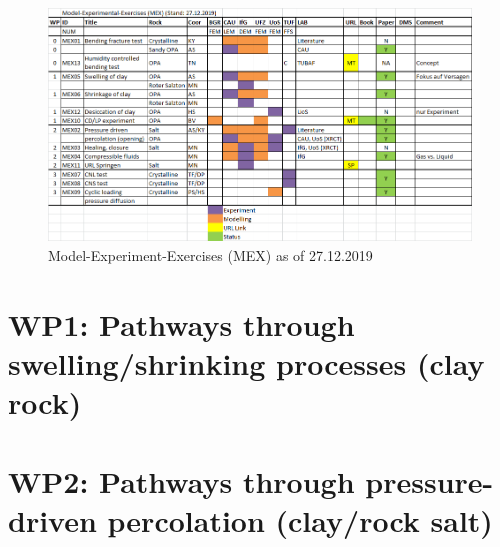 \clearpage
\begin{figure}[hbtp]
\caption{Model-Experiment-Exercises (MEX) as of 27.12.2019}
\centering
\includegraphics[width=18cm,angle=90]{figures/mex-overview.png}
\end{figure}

\clearpage

\clearpage

\clearpage
%
\section*{WP1: Pathways through swelling/shrinking processes (clay rock)}

\clearpage
\clearpage

\clearpage
\clearpage

\clearpage

\clearpage
\clearpage
\section*{WP2: Pathways through pressure-driven percolation (clay/rock salt)}

\clearpage

\clearpage

\clearpage

\clearpage

\clearpage
